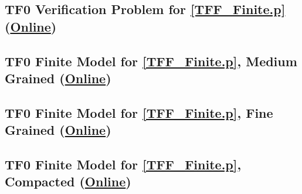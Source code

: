 \documentclass{easychair}
\begin{document}
\begin{minipage}{\textwidth}
\subsection{TF0 Verification Problem for \ref{TFF_Finite.p}
(\href{https://raw.githubusercontent.com/GeoffsPapers/InterpretationFormat/master/Examples/TFF_Finite.s.p}{Online})}
\label{TFF_Finite.s.p}
\begin{small}

\end{small}
\end{minipage}

\begin{minipage}{\textwidth}
\subsection{TF0 Finite Model for \ref{TFF_Finite.p}, Medium Grained
(\href{https://raw.githubusercontent.com/GeoffsPapers/InterpretationFormat/master/Examples/TFF_Finite_Medium.s}{Online})}
\label{TFF_Finite_Medium.s}
\begin{small}

\end{small}
\end{minipage}

\begin{minipage}{\textwidth}
\subsection{TF0 Finite Model for \ref{TFF_Finite.p}, Fine Grained
(\href{https://raw.githubusercontent.com/GeoffsPapers/InterpretationFormat/master/Examples/TFF_Finite_Fine.s}{Online})}
\label{TFF_Finite_Fine.s}
\begin{small}

\end{small}
\end{minipage}

\begin{minipage}{\textwidth}
\subsection{TF0 Finite Model for \ref{TFF_Finite.p}, Compacted
(\href{https://raw.githubusercontent.com/GeoffsPapers/InterpretationFormat/master/Examples/TFF_Finite_Compact.s}{Online})}
\label{TFF_Finite_Compact.s}
\begin{small}

\end{small}
\end{minipage}
\end{document}
